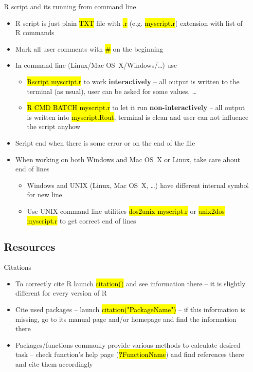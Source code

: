\documentclass[compress, ucs, xelatex, 11pt, xcolor=svgnames,
  hyperref={
    bookmarks=true,
    unicode=true,
    colorlinks=true,
    pdftitle={Molecular data in R},
    plainpages=false,
    pdfauthor={Vojtech Zeisek},
    pdfsubject={Course about phylogeny and evolution in R},
    pdfcreator={XeLaTeX},
    pdfkeywords={R, evolution, phylogeny, molecular data},
    linkcolor=Tomato,
    anchorcolor=SaddleBrown,
    citecolor=Goldenrod,
    filecolor=DarkMagenta,
    menucolor=Sienna,
    urlcolor=DarkTurquoise,
    pdftex},
  url={hyphens, lowtilde} %
  ]{beamer}
\renewcommand{\texttt}[1]{\hl{\ttfamily #1}}
\begin{document}
\begin{frame}{R script and its running from command line}
  \begin{itemize}
    \item R script is just plain \texttt{TXT} file with \texttt{.r} (e.g. \texttt{myscript.r}) extension with list of R commands
    \item Mark all user comments with \texttt{\#} on the beginning
    \item In command line (Linux/Mac OS~X/Windows/\ldots) use
    \begin{itemize}
      \item \texttt{Rscript myscript.r} to work \textbf{interactively} -- all output is written to the terminal (as usual), user can be asked for some values, \ldots
      \item \texttt{R CMD BATCH myscript.r} to let it run \textbf{non-interactively} -- all output is written into \texttt{myscript.Rout}, terminal is clean and user can not influence the script anyhow
    \end{itemize}
    \item Script end when there is some error or on the end of the file
    \item When working on both Windows and Mac OS~X or Linux, take care about end of lines
    \begin{itemize}
      \item Windows and UNIX (Linux, Mac OS~X, \ldots) have different internal symbol for new line
      \item Use UNIX command line utilities \texttt{dos2unix myscript.r} or \texttt{unix2dos myscript.r} to get correct end of lines
    \end{itemize}
  \end{itemize}
\end{frame}

\subsection{Resources}

\begin{frame}{Citations}
\begin{itemize}
  \item To correctly cite R launch \texttt{citation()} and see information there -- it is slightly different for every version of R
  \item Cite used packages -- launch \texttt{citation("PackageName")} -- if this information is missing, go to its manual page and/or homepage and find the information there
  \item Packages/functions commonly provide various methods to calculate desired task -- check function's help page (\texttt{\textbf{?}FunctionName}) and find references there and cite them accordingly
\end{itemize}
\end{frame}
\end{document}
